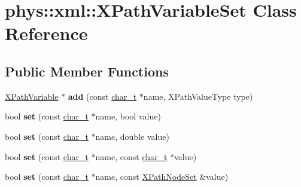 \hypertarget{classphys_1_1xml_1_1XPathVariableSet}{
\section{phys::xml::XPathVariableSet Class Reference}
\label{df/dd1/classphys_1_1xml_1_1XPathVariableSet}
}
\subsection*{Public Member Functions}
\begin{DoxyCompactItemize}
\item 
\hypertarget{classphys_1_1xml_1_1XPathVariableSet_a7f4958378a3d0c97d7a949bbb76a66fc}{
\hyperlink{classphys_1_1xml_1_1XPathVariable}{XPathVariable} $\ast$ {\bfseries add} (const \hyperlink{namespacephys_1_1xml_afc87705cd1c2917d87b879715a2d8f6e}{char\_\-t} $\ast$name, XPathValueType type)}
\label{df/dd1/classphys_1_1xml_1_1XPathVariableSet_a7f4958378a3d0c97d7a949bbb76a66fc}

\item 
\hypertarget{classphys_1_1xml_1_1XPathVariableSet_a90c3f392f438a94d957e33062a26573a}{
bool {\bfseries set} (const \hyperlink{namespacephys_1_1xml_afc87705cd1c2917d87b879715a2d8f6e}{char\_\-t} $\ast$name, bool value)}
\label{df/dd1/classphys_1_1xml_1_1XPathVariableSet_a90c3f392f438a94d957e33062a26573a}

\item 
\hypertarget{classphys_1_1xml_1_1XPathVariableSet_affddf57c4560d4e5d75a67c557e888f9}{
bool {\bfseries set} (const \hyperlink{namespacephys_1_1xml_afc87705cd1c2917d87b879715a2d8f6e}{char\_\-t} $\ast$name, double value)}
\label{df/dd1/classphys_1_1xml_1_1XPathVariableSet_affddf57c4560d4e5d75a67c557e888f9}

\item 
\hypertarget{classphys_1_1xml_1_1XPathVariableSet_ada5a64058f34e39757cbc88eb91be199}{
bool {\bfseries set} (const \hyperlink{namespacephys_1_1xml_afc87705cd1c2917d87b879715a2d8f6e}{char\_\-t} $\ast$name, const \hyperlink{namespacephys_1_1xml_afc87705cd1c2917d87b879715a2d8f6e}{char\_\-t} $\ast$value)}
\label{df/dd1/classphys_1_1xml_1_1XPathVariableSet_ada5a64058f34e39757cbc88eb91be199}

\item 
\hypertarget{classphys_1_1xml_1_1XPathVariableSet_a1a03c2aaafb815aaaee49c217799132f}{
bool {\bfseries set} (const \hyperlink{namespacephys_1_1xml_afc87705cd1c2917d87b879715a2d8f6e}{char\_\-t} $\ast$name, const \hyperlink{classphys_1_1xml_1_1XPathNodeSet}{XPathNodeSet} \&value)}
\label{df/dd1/classphys_1_1xml_1_1XPathVariableSet_a1a03c2aaafb815aaaee49c217799132f}


\end{DoxyCompactItemize}
